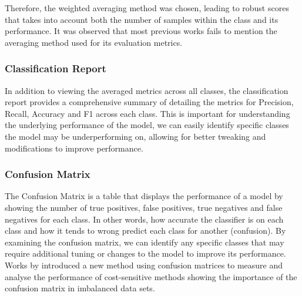 Therefore, the weighted averaging method was chosen, leading to robust scores that takes into account both the number of samples within the class and its performance. It was observed that most previous works fails to mention the averaging method used for its evaluation metrics.

\subsubsection*{Classification Report}

In addition to viewing the averaged metrics across all classes, the classification report provides a comprehensive summary of detailing the metrics for Precision, Recall, Accuracy and F1 across each class. This is important for understanding the underlying performance of the model, we can easily identify specific classes the model may be underperforming on, allowing for better tweaking and modifications to improve performance.

\subsubsection*{Confusion Matrix}

The Confusion Matrix is a table that displays the performance of a model by showing the number of true positives, false positives, true negatives and false negatives for each class. In other words, how accurate the classifier is on each class and how it tends to wrong predict each class for another (confusion). By examining the confusion matrix, we can identify any specific classes that may require additional tuning or changes to the model to improve its performance. Works by \textcite{pmlr-v29-Koco13} introduced a new method using confusion matrices to measure and analyse the performance of cost-sensitive methods showing the importance of the confusion matrix in imbalanced data sets.

